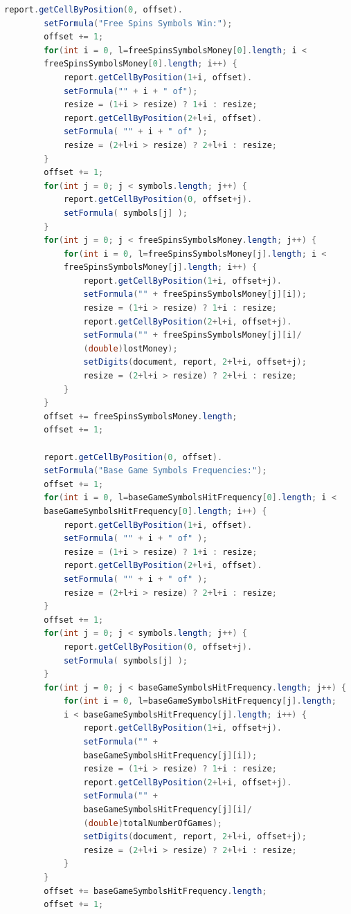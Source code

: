 \documentclass[12pt,twoside,openany]{book}
\begin{document}
\begin{lstlisting}[language=Java, caption={Statistical report}, label=listing030]
		report.getCellByPosition(0, offset).
		setFormula("Free Spins Symbols Win:");
		offset += 1;
		for(int i = 0, l=freeSpinsSymbolsMoney[0].length; i <
		freeSpinsSymbolsMoney[0].length; i++) {
			report.getCellByPosition(1+i, offset).
			setFormula("" + i + " of");
			resize = (1+i > resize) ? 1+i : resize;
			report.getCellByPosition(2+l+i, offset).
			setFormula( "" + i + " of" );
			resize = (2+l+i > resize) ? 2+l+i : resize;
		}
		offset += 1;
		for(int j = 0; j < symbols.length; j++) {
			report.getCellByPosition(0, offset+j).
			setFormula( symbols[j] );
		}
		for(int j = 0; j < freeSpinsSymbolsMoney.length; j++) {
			for(int i = 0, l=freeSpinsSymbolsMoney[j].length; i <
			freeSpinsSymbolsMoney[j].length; i++) {
				report.getCellByPosition(1+i, offset+j).
				setFormula("" + freeSpinsSymbolsMoney[j][i]);
				resize = (1+i > resize) ? 1+i : resize;
				report.getCellByPosition(2+l+i, offset+j).
				setFormula("" + freeSpinsSymbolsMoney[j][i]/
				(double)lostMoney);
				setDigits(document, report, 2+l+i, offset+j);
				resize = (2+l+i > resize) ? 2+l+i : resize;
			}
		}
		offset += freeSpinsSymbolsMoney.length;
		offset += 1;

		report.getCellByPosition(0, offset).
		setFormula("Base Game Symbols Frequencies:");
		offset += 1;
		for(int i = 0, l=baseGameSymbolsHitFrequency[0].length; i <
		baseGameSymbolsHitFrequency[0].length; i++) {
			report.getCellByPosition(1+i, offset).
			setFormula( "" + i + " of" );
			resize = (1+i > resize) ? 1+i : resize;
			report.getCellByPosition(2+l+i, offset).
			setFormula( "" + i + " of" );
			resize = (2+l+i > resize) ? 2+l+i : resize;
		}
		offset += 1;
		for(int j = 0; j < symbols.length; j++) {
			report.getCellByPosition(0, offset+j).
			setFormula( symbols[j] );
		}
		for(int j = 0; j < baseGameSymbolsHitFrequency.length; j++) {
			for(int i = 0, l=baseGameSymbolsHitFrequency[j].length;
			i < baseGameSymbolsHitFrequency[j].length; i++) {
				report.getCellByPosition(1+i, offset+j).
				setFormula("" +
				baseGameSymbolsHitFrequency[j][i]);
				resize = (1+i > resize) ? 1+i : resize;
				report.getCellByPosition(2+l+i, offset+j).
				setFormula("" +
				baseGameSymbolsHitFrequency[j][i]/
				(double)totalNumberOfGames);
				setDigits(document, report, 2+l+i, offset+j);
				resize = (2+l+i > resize) ? 2+l+i : resize;
			}
		}
		offset += baseGameSymbolsHitFrequency.length;
		offset += 1;


\end{lstlisting}
\end{document}
